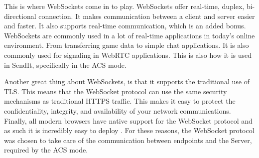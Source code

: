 This is where WebSockets come in to play. WebSockets offer real-time, duplex, bi-directional connection. It makes communication between a client and server easier and faster. It also supports real-time communication, which is an added bonus. WebSockets are commonly used in a lot of real-time applications in today's online environment. From transferring game data to simple chat applications. It is also commonly used for signaling in WebRTC applications. This is also how it is used in SendIt, specifically in the ACS mode.

Another great thing about WebSockets, is that it supports the traditional use of TLS. This means that the WebSocket protocol can use the same security mechanisms as traditional HTTPS traffic. This makes it easy to protect the confidentiality, integrity, and availability of your network communications. Finally, all modern browsers have native support for the WebSocket protocol and as such it is incredibly easy to deploy \cite{wangDefinitiveGuideHTML52013}. For these reasons, the WebSocket protocol was chosen to take care of the communication between endpoints and the Server, required by the ACS mode.

